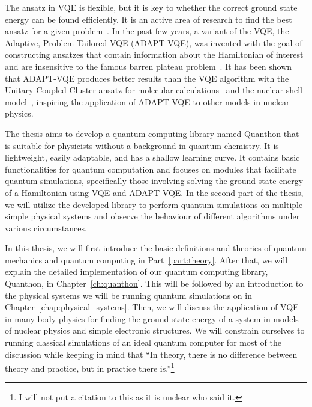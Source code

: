 The ansatz in VQE is flexible, but it is key to whether the correct ground state energy can be found efficiently. It is an active area of research to find the best ansatz for a given problem~\cite{park2024}. In the past few years, a variant of the VQE, the Adaptive, Problem-Tailored VQE (ADAPT-VQE), was invented with the goal of constructing ansatzes that contain information about the Hamiltonian of interest and are insensitive to the famous barren plateau problem~\cite{grimsley2019, Grimsley_2023}. It has been shown that ADAPT-VQE produces better results than the VQE algorithm with the Unitary Coupled-Cluster ansatz for molecular calculations~\cite{grimsley2019} and the nuclear shell model~\cite{P_rez_Obiol_2023}, inspiring the application of ADAPT-VQE to other models in nuclear physics.

The thesis aims to develop a quantum computing library named Quanthon that is suitable for physicists without a background in quantum chemistry. It is lightweight, easily adaptable, and has a shallow learning curve. It contains basic functionalities for quantum computation and focuses on modules that facilitate quantum simulations, specifically those involving solving the ground state energy of a Hamiltonian using VQE and ADAPT-VQE. In the second part of the thesis, we will utilize the developed library to perform quantum simulations on multiple simple physical systems and observe the behaviour of different algorithms under various circumstances.

In this thesis, we will first introduce the basic definitions and theories of quantum mechanics and quantum computing in Part~\ref{part:theory}. After that, we will explain the detailed implementation of our quantum computing library, Quanthon, in Chapter~\ref{ch:quanthon}. This will be followed by an introduction to the physical systems we will be running quantum simulations on in Chapter~\ref{chap:physical_systems}. Then, we will discuss the application of VQE in many-body physics for finding the ground state energy of a system in models of nuclear physics and simple electronic structures. We will constrain ourselves to running classical simulations of an ideal quantum computer for most of the discussion while keeping in mind that “In theory, there is no difference between theory and practice, but in practice there is.”\footnote{I will not put a citation to this as it is unclear who said it.}